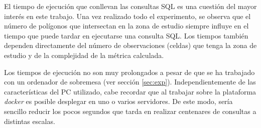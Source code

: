 El tiempo de ejecución que conllevan las consultas SQL es una cuestión del mayor interés en este trabajo. Una vez realizado todo el experimento, se observa que el número de polígonos que intersectan en la zona de estudio siempre influye en el tiempo que puede tardar en ejecutarse una consulta SQL. Los tiempos también dependen directamente del número de observaciones (celdas) que tenga la zona de estudio y de la complejidad de la métrica calculada. 

Los tiempos de ejecución no son muy prolongados a pesar de que se ha trabajado con un ordenador de sobremesa (ver sección \ref{sec:exp}). Independientemente de las características del PC utilizado, cabe recordar que al trabajar sobre la plataforma \textit{docker} es posible desplegar \pgland{} en uno o varios servidores. De este modo, sería sencillo reducir los pocos segundos que tarda \pgland{} en realizar centenares de consultas a distintas escalas.


